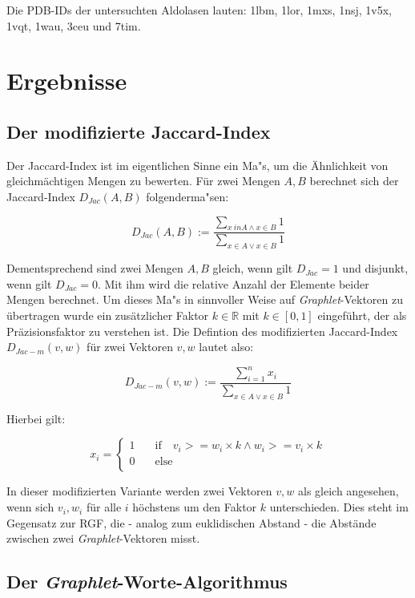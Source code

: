 \documentclass{report}
\begin{document}
Die PDB-IDs der untersuchten Aldolasen lauten: 1lbm, 1lor, 1mxs, 1nsj, 1v5x, 1vqt, 1wau, 3ceu und 7tim.



\chapter{Ergebnisse}

\section{Der modifizierte Jaccard-Index}


Der Jaccard-Index ist im eigentlichen Sinne ein Ma"s, um die \"Ahnlichkeit von gleichm\"achtigen Mengen zu bewerten. F\"ur zwei Mengen $A,B$ berechnet sich der Jaccard-Index $D_{Jac}(A,B)$ folgenderma"sen:

\[ D_{Jac}(A,B) := \frac{\sum_{x \ in A \land x \in B} 1}{\sum_{x \in A \lor x \in B} 1} \]

Dementsprechend sind zwei Mengen $A,B$ gleich, wenn  gilt $D_{Jac} = 1$ und disjunkt, wenn gilt $D_{Jac} = 0$. Mit ihm wird die relative Anzahl der Elemente beider Mengen berechnet.
Um dieses Ma"s in sinnvoller Weise auf \textit{Graphlet}-Vektoren zu \"ubertragen wurde ein zus\"atzlicher Faktor $k \in \mathbb{R} $ mit $k \in [0,1]$  eingef\"uhrt, der als Pr\"azisionsfaktor zu verstehen ist. Die Defintion des modifizierten Jaccard-Index $D_{Jac-m}(v,w)$ f\"ur zwei Vektoren $v,w$ lautet also:

\[ D_{Jac-m}(v,w) := \frac{\sum_{i = 1}^n x_i}{\sum_{x \in A \lor x \in B} 1} \]

Hierbei gilt:

\[ x_i = 
   \begin{cases}
     1     & \quad \mathrm{if} \quad v_i >= w_i \times k \land w_i >= v_i \times k \\
     0     & \quad \mathrm{else} \\
   \end{cases}
\]

In dieser modifizierten Variante werden zwei Vektoren $v,w$ als gleich angesehen, wenn sich $v_i,w_i$ f\"ur alle $i$ h\"ochstens um den Faktor $k$ unterschieden.
Dies steht im Gegensatz zur RGF, die - analog zum euklidischen Abstand - die Abst\"ande zwischen zwei \textit{Graphlet}-Vektoren misst.


\section{Der \textit{Graphlet}-Worte-Algorithmus}
\end{document}
